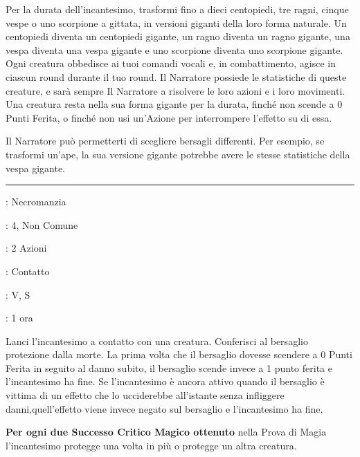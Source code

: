 \begin{multicols}{2}
Per la durata dell'incantesimo, trasformi fino a dieci centopiedi, tre ragni, cinque vespe o uno scorpione a gittata, in versioni giganti della loro forma naturale. Un centopiedi diventa un centopiedi gigante, un ragno diventa un ragno gigante, una vespa diventa una vespa gigante e uno scorpione diventa uno scorpione gigante. Ogni creatura obbedisce ai tuoi comandi vocali e, in combattimento, agisce in ciascun round durante il tuo round. Il Narratore possiede le statistiche di queste creature, e sarà sempre Il Narratore a risolvere le loro azioni e i loro movimenti. Una creatura resta nella sua forma gigante per la durata, finché non scende a 0 Punti Ferita, o finché non usi un'Azione per interrompere l'effetto su di essa.

Il Narratore può permetterti di scegliere bersagli differenti. Per esempio, se trasformi un'ape, la sua versione gigante potrebbe avere le stesse statistiche della vespa gigante.

\smallskip\noindent\rule{\linewidth}{2pt} \hypertarget{Interdizione alla Morte}{}\smallskip{}
\noindent
\begin{description}[noitemsep, topsep=0pt, parsep=0pt, partopsep=0pt, leftmargin=0cm, labelwidth=2.8cm]
	\item[\textbf{Lista di Magia}]: Necromanzia
	\item[\textbf{Livello}]: 4, Non Comune
	\item[\textbf{T. di Lancio}]: 2 Azioni
	\item[\textbf{Gittata}]: Contatto
	\item[\textbf{Componenti}]: V, S
	\item[\textbf{Durata}]: 1 ora
\end{description}

Lanci l'incantesimo a contatto con una creatura. Conferisci al bersaglio protezione dalla morte. La prima volta che il bersaglio dovesse scendere a 0 Punti Ferita in seguito al danno subito, il bersaglio scende invece a 1 punto ferita e l'incantesimo ha fine. Se l'incantesimo è ancora attivo quando il bersaglio è vittima di un effetto che lo ucciderebbe all'istante senza infliggere danni,quell'effetto viene invece negato sul bersaglio e l'incantesimo ha fine.

\textbf{Per ogni due Successo Critico Magico ottenuto} nella Prova di Magia l'incantesimo protegge una volta in più o protegge un altra creatura.


\end{multicols}

